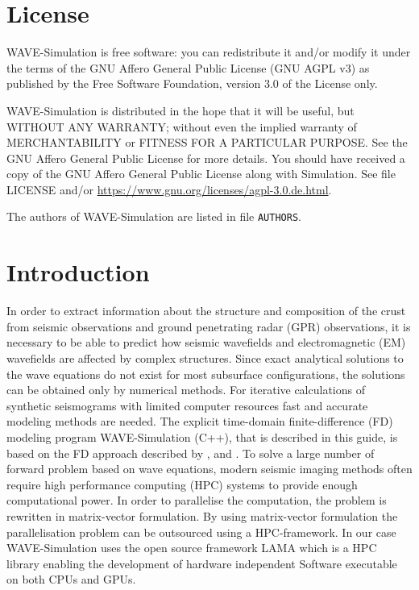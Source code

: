 \documentclass[pdftex,a4paper,parskip,listof=totoc,bibliography=totoc,onehalfspacing,12pt]{scrreprt}
\begin{document}
\setcounter{page}{1}

\cleardoublepage
\chapter*{License}

WAVE-Simulation is free software: you can redistribute it and/or modify it under the terms of the GNU Affero General Public License (GNU AGPL v3) as published by the Free Software Foundation, version 3.0 of the License only.
 
WAVE-Simulation is distributed in the hope that it will be useful, but WITHOUT ANY WARRANTY; without even the implied warranty of MERCHANTABILITY or FITNESS FOR A PARTICULAR PURPOSE. See the GNU Affero General Public License for more details. You should have received a copy of the GNU Affero General Public License along with Simulation. See file LICENSE and/or \url{https://www.gnu.org/licenses/agpl-3.0.de.html}.

The authors of WAVE-Simulation are listed in file \lstinline{AUTHORS}.

\cleardoublepage
\chapter*{Introduction}

In order to extract information about the structure and composition of the crust from seismic observations and ground penetrating radar (GPR) observations, it is necessary to be able to predict how seismic wavefields and electromagnetic (EM) wavefields are affected by complex structures. Since exact analytical solutions to the wave equations do not exist for most subsurface configurations, the solutions can be obtained only by numerical methods. For iterative calculations of synthetic seismograms with limited computer resources fast and accurate modeling methods are needed. The explicit time-domain finite-difference (FD) modeling program WAVE-Simulation (C++), that is described in this guide, is based on the FD approach described by \cite{yee1966numerical}, \cite{virieux1986p} and \cite{levander1988fourth}. To solve a large number of forward problem based on wave equations, modern seismic imaging methods often require high performance computing (HPC) systems to provide enough computational power. In order to parallelise the computation, the problem is rewritten in matrix-vector formulation. By using matrix-vector formulation the parallelisation problem can be outsourced using a HPC-framework. In our case WAVE-Simulation uses the open source framework LAMA which is a HPC library enabling the development of hardware independent Software executable on both CPUs and GPUs.
\end{document}
